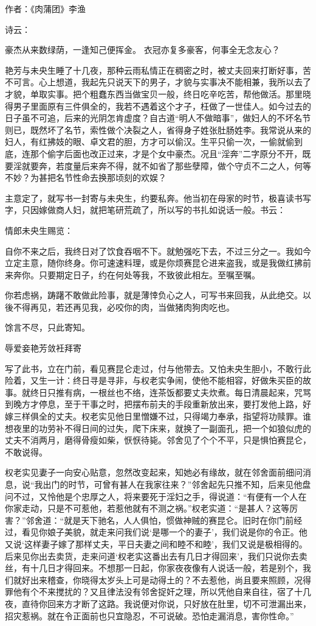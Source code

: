 \documentclass[a4paper,12pt,UTF8,twoside]{ctexbook}
\begin{document}
作者：《肉蒲团》李渔

诗云：

豪杰从来数绿荫，一逢知己便挥金。
衣冠亦复多豪客，何事全无念友心？

艳芳与未央生睡了十几夜，那种云雨私情正在稠密之时，被丈夫回来打断好事，苦不可言。心上想道，我起先只说天下的男子，才貌与实事决不能相兼，我所以去了才貌，单取实事。把个粗蠢东西当做宝贝一般，终日吃辛吃苦，帮他做活。那里晓得男子里面原有三件俱全的，我若不遇着这个才子，枉做了一世佳人。如今过去的日子虽不可追，后来的光阴怎肯虚度？自古道“明人不做暗事”，做妇人的不坏名节则已，既然坏了名节，索性做个决裂之人，省得身子姓张肚肠姓李。我常说从来的妇人，有红拂妓的眼、卓文君的胆，方才可以偷汉。生平只偷一次，一偷就偷到底，连那个偷字后面也改正过来，才是个女中豪杰。况且“淫奔”二字原分不开，既要淫就要奔，若度量后来奔不得，就不如省了那些孽障，做个守贞不二之人，何等不妙？为甚把名节性命去换那顷刻的欢娱？

主意定了，就写书一封寄与未央生，约要私奔。他当初在母家的时节，极喜读书写字，只因嫁做商人妇，就把笔研荒疏了，所以写的书扎如说话一般。书云：

情郎未央生赐览：

自你不来之后，我终日对了饮食吞咽不下。就勉强吃下去，不过三分之一。我如今立定主意，随你终身。你可速速料理，或是你烦赛昆仑进来盗我，或是我做红拂前来奔你。只要期定日子，约在何处等我，不致彼此相左。至嘱至嘱。

你若虑祸，踌躇不敢做此险事，就是薄悻负心之人，可写书来回我，从此绝交。以後不得再见，若还再见我，必咬你的肉，当做猪肉狗肉吃也。

馀言不尽，只此寄知。

辱爱妾艳芳敛衽拜寄

写了此书，立在门前，看见赛昆仑走过，付与他带去。又怕未央生胆小，不敢行此险着，又生一计：终日寻是寻非，与权老实争闹，使他不能相容，好做朱买臣的故事。就终日只推有病，一根丝也不络，连茶饭都要丈夫炊煮。每日清晨起来，咒骂到晚方才停息，至于干事之时，把摆布前夫的手段重新放出来，要打发他上路，好嫁三样俱全的丈夫。权老实见他日里憎嫌不过，只得竭力奉承，指望将功赎罪。谁想夜里的功劳补不得日间的过失，爬下床来，就换了一副面孔，把一个如狼似虎的丈夫不消两月，磨得骨瘦如柴，恹恹待毙。邻舍见了个个不平，只是惧怕赛昆仑，不敢说得。

权老实见妻子一向安心贴意，忽然改变起来，知她必有缘故，就在邻舍面前细问消息，说“我出门的时节，可曾有甚人在我家往来？”邻舍起先只推不知，后来见他盘问不过，又怜他是个忠厚之人，将来要死于淫妇之手，得说道：“有便有一个人在你家走动，只是不可惹他，若惹他就有不测之祸。”权老实道：“是甚人？这等厉害？”邻舍道：“就是天下驰名，人人俱怕，惯做神贼的赛昆仑。旧时在你门前经过，看见你娘子美貌，就走来问我们说‘是哪一个的妻子’，我们说是你的令正。他又说‘这样妻子嫁了那样丈夫，平日夫妻之间和睦不和睦’，我们又说是极相得的。后来见你出去卖货，走来问道‘权老实这番出去有几日才得回来’，我们只说你去卖丝，有十几日才得回来。不想那一日起，你家夜夜像有人说话一般，若是别个，我们就好出来稽查，你晓得太岁头上可是动得土的？不去惹他，尚且要来照顾，况得罪他有个不来搅扰的？又且律法没有邻舍捉奸之理，所以凭他自来自往，宿了十几夜，直待你回来方才断了这路。我说便对你说，只好放在肚里，切不可泄漏出来，招灾惹祸。就在令正面前也只宜隐忍，不可说破。恐怕走漏消息，害你性命。”
\end{document}

